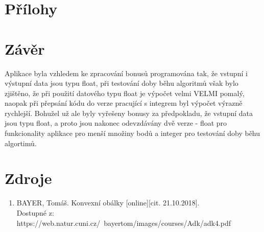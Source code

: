 \documentclass[a4paper, 12pt]{article}
\begin{document}
\section{Přílohy}

\clearpage
\section{Závěr}

Aplikace byla vzhledem ke zpracování bonusů programována tak, že vstupní i výstupní data jsou typu float, při testování doby běhu algoritmů však bylo zjištěno, že při použití datového typu float je výpočet velmi VELMI pomalý, naopak při přepsání kódu do verze pracující s integrem byl výpočet výrazně rychlejší. Bohužel už ale byly vyřešeny bonusy za předpokladu, že vstupní data jsou typu float, a proto jsou nakonec odevzdávány dvě verze - float pro funkcionality aplikace pro menší množiny bodů a integer pro testování doby běhu algortimů.

\clearpage
\section{Zdroje}

\begin{enumerate}
\item  BAYER, Tomáš. Konvexní obálky [online][cit. 21.10.2018]. \\
Dostupné z: https://web.natur.cuni.cz/~bayertom/images/courses/Adk/adk4.pdf  \\
\end{enumerate}
\end{document}
